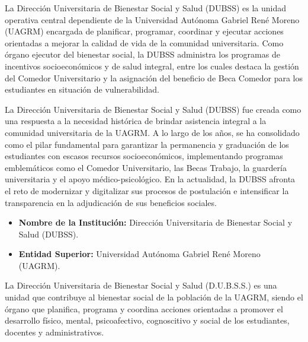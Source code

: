 \label{sec:empresa_general}

La Dirección Universitaria de Bienestar Social y Salud (DUBSS) es la unidad operativa central dependiente de la Universidad Autónoma Gabriel René Moreno (UAGRM) encargada de planificar, programar, coordinar y ejecutar acciones orientadas a mejorar la calidad de vida de la comunidad universitaria. Como órgano ejecutor del bienestar social, la DUBSS administra los programas de incentivos socioeconómicos y de salud integral, entre los cuales destaca la gestión del Comedor Universitario y la asignación del beneficio de Beca Comedor para los estudiantes en situación de vulnerabilidad.

La Dirección Universitaria de Bienestar Social y Salud (DUBSS) fue creada como una respuesta a la necesidad histórica de brindar asistencia integral a la comunidad universitaria de la UAGRM. A lo largo de los años, se ha consolidado como el pilar fundamental para garantizar la permanencia y graduación de los estudiantes con escasos recursos socioeconómicos, implementando programas emblemáticos como el Comedor Universitario, las Becas Trabajo, la guardería universitaria y el apoyo médico-psicológico. En la actualidad, la DUBSS afronta el reto de modernizar y digitalizar sus procesos de postulación e intensificar la transparencia en la adjudicación de sus beneficios sociales.

\label{sec:empresa_nombre}

\begin{itemize}
    \item \textbf{Nombre de la Institución:} Dirección Universitaria de Bienestar Social y Salud (DUBSS).
    \item \textbf{Entidad Superior:} Universidad Autónoma Gabriel René Moreno (UAGRM).
\end{itemize}

\label{sec:empresa_mision}

La Dirección Universitaria de Bienestar Social y Salud (D.U.B.S.S.) es una unidad que contribuye al bienestar social de la población de la UAGRM, siendo el órgano que planifica, programa y coordina acciones orientadas a promover el desarrollo físico, mental, psicoafectivo, cognoscitivo y social de los estudiantes, docentes y administrativos.

